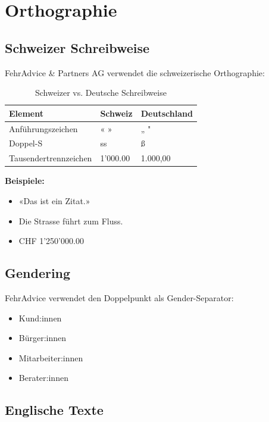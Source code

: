 \section{Orthographie}
\label{sec:sg-orthography}

\subsection{Schweizer Schreibweise}

FehrAdvice \& Partners AG verwendet die schweizerische Orthographie:

\begin{table}[h]
\centering
\caption{Schweizer vs. Deutsche Schreibweise}
\label{tab:swiss-orthography}
\begin{tabular}{lll}
\toprule
\textbf{Element} & \textbf{Schweiz} & \textbf{Deutschland} \\
\midrule
Anführungszeichen & « » & „ " \\
Doppel-S & ss & ß \\
Tausendertrennzeichen & 1'000.00 & 1.000,00 \\
\bottomrule
\end{tabular}
\end{table}

\textbf{Beispiele:}
\begin{itemize}
    \item «Das ist ein Zitat.»
    \item Die Strasse führt zum Fluss.
    \item CHF 1'250'000.00
\end{itemize}

\subsection{Gendering}

FehrAdvice verwendet den Doppelpunkt als Gender-Separator:

\begin{itemize}
    \item Kund:innen
    \item Bürger:innen
    \item Mitarbeiter:innen
    \item Berater:innen
\end{itemize}

\subsection{Englische Texte}

